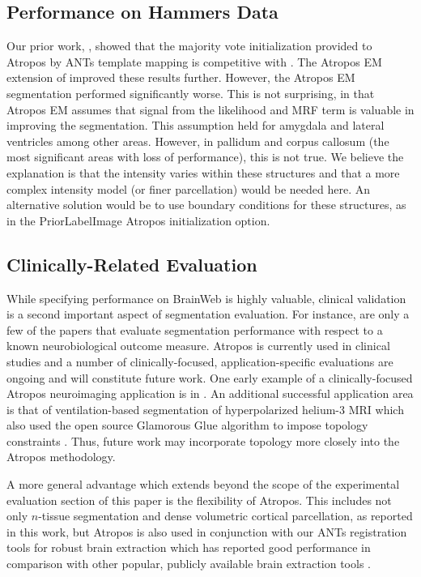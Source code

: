 \documentclass[11pt,english]{article}
\begin{document}
\subsection{Performance on Hammers Data}
Our prior work, \citep{Avants2011}, showed that the majority vote
initialization provided to Atropos by ANTs template mapping is
competitive with \cite{Heckemann2006}.  The Atropos EM extension of
improved these results further.  However, the Atropos EM segmentation
performed significantly worse.  This is not surprising, in that
Atropos EM assumes that signal from the likelihood and MRF term is
valuable in improving the segmentation.  This assumption held for
amygdala and lateral ventricles among other areas.  However, in
pallidum and corpus callosum (the most significant areas with loss of
performance), this is not true.  We believe the explanation is that
the intensity varies within these structures and that a more complex
intensity model (or finer parcellation) would be needed here.  An
alternative solution would be to use boundary conditions for these
structures, as in the {\ttfamily PriorLabelImage} Atropos initialization option.

\subsection{Clinically-Related Evaluation}
While specifying performance on BrainWeb is highly
valuable, clinical validation is a second important aspect of
segmentation evaluation.  For instance, 
\citep{Freeborough1997,Westlye2009,Sanchez-Benavides2010,Chou2009,Bresser2011}
are only a few of the papers that evaluate segmentation performance with
respect to a known neurobiological outcome measure.  Atropos is
currently used in clinical studies and a number of clinically-focused,
application-specific evaluations are ongoing and will constitute
future work.  One early example of a clinically-focused Atropos
neuroimaging application is in \citep{Avants2010c}.  An additional successful
application area is that of ventilation-based segmentation of hyperpolarized helium-3 MRI
\citep{Tustison2010a} which also used the open source Glamorous Glue
algorithm to impose topology constraints \citep{Tustison2010b}.  Thus, future work may
incorporate topology more closely into the Atropos methodology.  

A more general advantage which extends beyond the scope of the experimental 
evaluation section of this paper is the flexibility of Atropos.   This includes 
not only $n$-tissue segmentation and dense volumetric cortical parcellation,
as reported in this work, but Atropos is also used in conjunction with our ANTs registration tools for robust
brain extraction which has reported good performance in comparison with other
popular, publicly available brain extraction tools \citep{Avants2010a}.  
 
\end{document}
